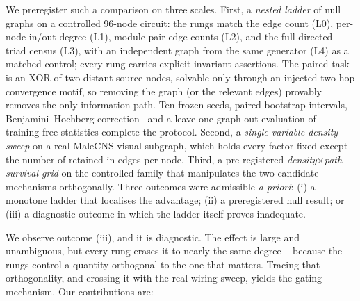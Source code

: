 \documentclass[10pt,twocolumn,letterpaper]{article}
\begin{document}
We preregister such a comparison on three scales. First, a \emph{nested
ladder} of null graphs on a controlled 96-node circuit: the rungs match the
edge count (L0), per-node in/out degree (L1), module-pair edge counts (L2),
and the full directed triad census (L3), with an independent graph from the
same generator (L4) as a matched control; every rung carries explicit
invariant assertions. The paired task is an XOR of two distant source nodes,
solvable only through an injected two-hop convergence motif, so removing the
graph (or the relevant edges) provably removes the only information path.
Ten frozen seeds, paired bootstrap intervals, Benjamini--Hochberg
correction~\cite{benjamini1995} and a leave-one-graph-out evaluation of
training-free statistics complete the protocol. Second, a
\emph{single-variable density sweep} on a real MaleCNS visual subgraph, which
holds every factor fixed except the number of retained in-edges per node.
Third, a pre-registered \emph{density$\times$path-survival grid} on the
controlled family that manipulates the two candidate mechanisms orthogonally.
Three outcomes were admissible \emph{a priori}: (i) a monotone ladder that
localises the advantage; (ii) a preregistered null result; or (iii) a
diagnostic outcome in which the ladder itself proves inadequate.

We observe outcome (iii), and it is diagnostic. The effect is large and
unambiguous, but every rung erases it to nearly the same degree -- because
the rungs control a quantity orthogonal to the one that matters. Tracing that
orthogonality, and crossing it with the real-wiring sweep, yields the
gating mechanism. Our contributions are:
\end{document}
